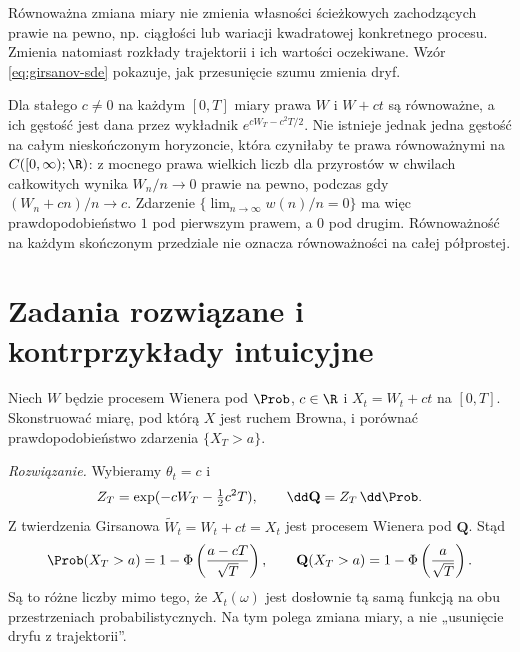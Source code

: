 \begin{uwaga}
Równoważna zmiana miary nie zmienia własności
ścieżkowych zachodzących prawie na pewno, np. ciągłości
lub wariacji kwadratowej konkretnego procesu.
Zmienia natomiast rozkłady trajektorii i ich wartości
oczekiwane. Wzór \eqref{eq:girsanov-sde} pokazuje,
jak przesunięcie szumu zmienia dryf.
\end{uwaga}

\begin{przyklad}
Dla stałego $c\ne0$ na każdym $[0,T]$ miary prawa
$W$ i $W+ct$ są równoważne, a ich gęstość jest dana
przez wykładnik $e^{cW_T-c^2T/2}$. Nie istnieje jednak
jedna gęstość na całym nieskończonym horyzoncie,
która czyniłaby te prawa równoważnymi na
$C([0,\infty);\R)$: z mocnego prawa wielkich liczb
dla przyrostów w chwilach całkowitych wynika
$W_n/n\to0$ prawie na pewno, podczas gdy
$(W_n+cn)/n\to c$. Zdarzenie
$\{\lim_{n\to\infty}w(n)/n=0\}$ ma więc prawdopodobieństwo
$1$ pod pierwszym prawem, a $0$ pod drugim.
Równoważność na każdym skończonym przedziale nie oznacza
równoważności na całej półprostej.
\end{przyklad}

\section{Zadania rozwiązane i kontrprzykłady intuicyjne}

\begin{zadanie}
Niech $W$ będzie procesem Wienera pod $\Prob$, $c\in\R$
i $X_t=W_t+ct$ na $[0,T]$. Skonstruować miarę,
pod którą $X$ jest ruchem Browna, i porównać
prawdopodobieństwo zdarzenia $\{X_T>a\}$.

\emph{Rozwiązanie.} Wybieramy $\theta_t=c$ i
\[
Z_T=\exp(-cW_T-\tfrac12c^2T),\qquad
\dd\mathbf Q=Z_T\,\dd\Prob.
\]
Z twierdzenia Girsanowa $\widetilde W_t=W_t+ct=X_t$
jest procesem Wienera pod $\mathbf Q$. Stąd
\[
\Prob(X_T>a)=1-\Phi\left(\frac{a-cT}{\sqrt T}\right),
\qquad
\mathbf Q(X_T>a)=1-\Phi\left(\frac a{\sqrt T}\right).
\]
Są to różne liczby mimo tego, że $X_t(\omega)$
jest dosłownie tą samą funkcją na obu przestrzeniach
probabilistycznych. Na tym polega zmiana miary, a nie
„usunięcie dryfu z trajektorii”.
\end{zadanie}

